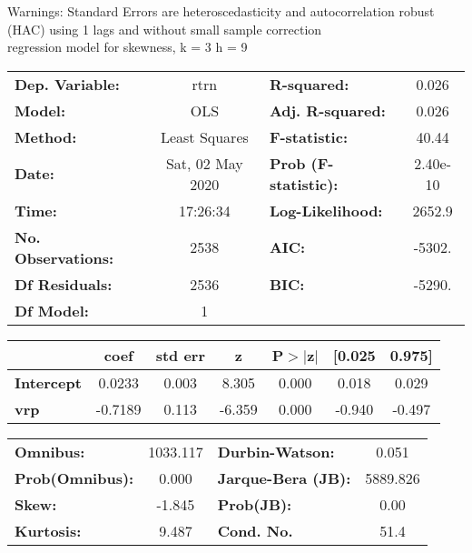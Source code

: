 Warnings: \newline
 [1] Standard Errors are heteroscedasticity and autocorrelation robust (HAC) using 1 lags and without small sample correction\\ 

regression model for skewness, k = 3 h = 9\begin{center}
\begin{tabular}{lclc}
\toprule
\textbf{Dep. Variable:}    &       rtrn       & \textbf{  R-squared:         } &     0.026   \\
\textbf{Model:}            &       OLS        & \textbf{  Adj. R-squared:    } &     0.026   \\
\textbf{Method:}           &  Least Squares   & \textbf{  F-statistic:       } &     40.44   \\
\textbf{Date:}             & Sat, 02 May 2020 & \textbf{  Prob (F-statistic):} &  2.40e-10   \\
\textbf{Time:}             &     17:26:34     & \textbf{  Log-Likelihood:    } &    2652.9   \\
\textbf{No. Observations:} &        2538      & \textbf{  AIC:               } &    -5302.   \\
\textbf{Df Residuals:}     &        2536      & \textbf{  BIC:               } &    -5290.   \\
\textbf{Df Model:}         &           1      & \textbf{                     } &             \\
\bottomrule
\end{tabular}
\begin{tabular}{lcccccc}
                   & \textbf{coef} & \textbf{std err} & \textbf{z} & \textbf{P$> |$z$|$} & \textbf{[0.025} & \textbf{0.975]}  \\
\midrule
\textbf{Intercept} &       0.0233  &        0.003     &     8.305  &         0.000        &        0.018    &        0.029     \\
\textbf{vrp}       &      -0.7189  &        0.113     &    -6.359  &         0.000        &       -0.940    &       -0.497     \\
\bottomrule
\end{tabular}
\begin{tabular}{lclc}
\textbf{Omnibus:}       & 1033.117 & \textbf{  Durbin-Watson:     } &    0.051  \\
\textbf{Prob(Omnibus):} &   0.000  & \textbf{  Jarque-Bera (JB):  } & 5889.826  \\
\textbf{Skew:}          &  -1.845  & \textbf{  Prob(JB):          } &     0.00  \\
\textbf{Kurtosis:}      &   9.487  & \textbf{  Cond. No.          } &     51.4  \\
\bottomrule
\end{tabular}
\end{center}

